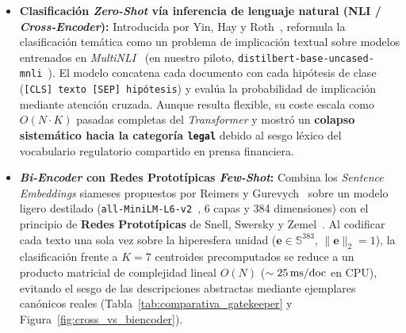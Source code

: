 \begin{itemize}
    \item \textbf{Clasificación \textit{Zero-Shot} vía inferencia de lenguaje natural (NLI / \textit{Cross-Encoder}):} Introducida por Yin, Hay y Roth~\cite{yin2019zeroshot}, reformula la clasificación temática como un problema de implicación textual sobre modelos entrenados en \textit{MultiNLI}~\cite{williams2018mnli} (en nuestro piloto, \texttt{distilbert-base-uncased-mnli}~\cite{sanh2019distilbert}). El modelo concatena cada documento con cada hipótesis de clase (\texttt{[CLS] texto [SEP] hipótesis}) y evalúa la probabilidad de implicación mediante atención cruzada. Aunque resulta flexible, su coste escala como $O(N \cdot K)$ pasadas completas del \textit{Transformer} y mostró un \textbf{colapso sistemático hacia la categoría \texttt{legal}} debido al sesgo léxico del vocabulario regulatorio compartido en prensa financiera.
    \item \textbf{\textit{Bi-Encoder} con Redes Prototípicas \textit{Few-Shot}:} Combina los \textit{Sentence Embeddings} siameses propuestos por Reimers y Gurevych~\cite{reimers2019sbert} sobre un modelo ligero destilado (\texttt{all-MiniLM-L6-v2}~\cite{wang2020minilm}, 6 capas y 384 dimensiones) con el principio de \textbf{Redes Prototípicas} de Snell, Swersky y Zemel~\cite{snell2017prototypical}. Al codificar cada texto una sola vez sobre la hiperesfera unidad ($\mathbf{e} \in \mathbb{S}^{383}$, $\|\mathbf{e}\|_2 = 1$), la clasificación frente a $K=7$ centroides precomputados se reduce a un producto matricial de complejidad lineal $O(N)$ ($\sim 25\text{\,ms/doc}$ en CPU), evitando el sesgo de las descripciones abstractas mediante ejemplares canónicos reales (Tabla~\ref{tab:comparativa_gatekeeper} y Figura~\ref{fig:cross_vs_biencoder}).
\end{itemize}

